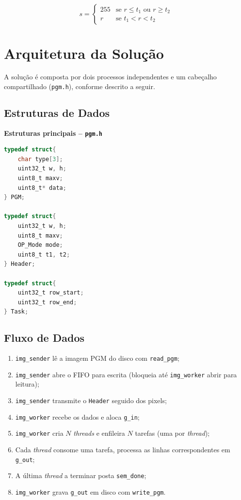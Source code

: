 \documentclass[12 pt]{abntex2}
\begin{document}
\begin{equation}
  s = \begin{cases}
    255 & \text{se } r \leq t_1 \text{ ou } r \geq t_2 \\
    r   & \text{se } t_1 < r < t_2
  \end{cases}
  \label{eq:slice}
\end{equation}

\section{Arquitetura da Solução}
 
A solução é composta por dois processos independentes e um cabeçalho
compartilhado (\texttt{pgm.h}), conforme descrito a seguir.
 
\subsection{Estruturas de Dados}
 
\textbf{Estruturas principais -- \texttt{pgm.h}}
\begin{lstlisting}[language=C]
typedef struct{
    char type[3];
    uint32_t w, h; 
    uint8_t maxv; 
    uint8_t* data;
} PGM; 

typedef struct{
    uint32_t w, h;
    uint8_t maxv;
    OP_Mode mode; 
    uint8_t t1, t2; 
} Header;

typedef struct{ 
    uint32_t row_start; 
    uint32_t row_end; 
} Task;
\end{lstlisting}
 
\subsection{Fluxo de Dados}
 
\begin{enumerate}
  \item \texttt{img\_sender} lê a imagem PGM do disco com \texttt{read\_pgm};
  \item \texttt{img\_sender} abre o FIFO para escrita (bloqueia até \texttt{img\_worker} abrir para leitura);
  \item \texttt{img\_sender} transmite o \texttt{Header} seguido dos pixels;
  \item \texttt{img\_worker} recebe os dados e aloca \texttt{g\_in};
  \item \texttt{img\_worker} cria $N$ \textit{threads} e enfileira $N$ tarefas (uma por \textit{thread});
  \item Cada \textit{thread} consome uma tarefa, processa as linhas correspondentes em \texttt{g\_out};
  \item A última \textit{thread} a terminar posta \texttt{sem\_done};
  \item \texttt{img\_worker} grava \texttt{g\_out} em disco com \texttt{write\_pgm}.
\end{enumerate}
 
\end{document}

